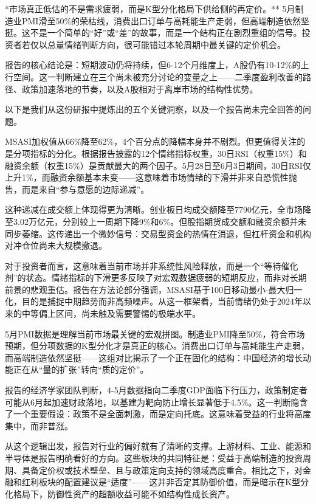 \documentclass[11pt]{ctexart}
\begin{document}
*市场真正低估的不是需求疲弱，而是K型分化格局下供给侧的再定价。** 5月制造业PMI滑至50\%的荣枯线，消费出口订单与高耗能生产走弱，但高端制造依然坚挺。这不是一个简单的“好”或“差”的故事，而是一个结构正在剧烈重组的信号。投资者若仅以总量情绪判断方向，很可能错过本轮周期中最关键的定价机会。

报告的核心结论是：短期波动仍将持续，但6-12个月维度上，A股仍有10-12\%的上行空间。这一判断建立在三个尚未被充分讨论的变量之上——二季度盈利改善的路径、政策加速落地的节奏，以及A股相对于离岸市场的结构性优势。

以下是我们从这份研报中提炼出的五个关键洞察，以及一个报告尚未完全回答的问题。

MSASI加权值从66\%降至62\%，4个百分点的降幅本身并不剧烈。但更值得关注的是分项指标的分化。根据报告披露的12个情绪指标权重，30日RSI（权重15\%）和融资余额（权重15\%）是贡献最大的两个因子。5月28日至6月3日期间，30日RSI仅上升1\%，而融资余额基本未变——这意味着市场情绪的下滑并非来自恐慌性抛售，而是来自“参与意愿的边际递减”。

这种递减在成交额上体现得更为清晰。创业板日均成交额降至7790亿元，全市场降至3.02万亿元，分别较上一周期下降9\%和6\%。但股指期货成交额和融资余额并未同步萎缩。这传递出一个微妙信号：交易型资金的热情在消退，但杠杆资金和机构对冲仓位尚未大规模撤退。

对于投资者而言，这意味着当前市场并非系统性风险释放，而是一个“等待催化剂”的状态。情绪指标的下滑更多反映了对宏观数据疲弱的短期反应，而非对长期前景的悲观重估。报告在方法论部分强调，MSASI基于100日移动最小-最大归一化，目的是捕捉中期趋势而非高频噪声。从这一框架看，当前情绪仍处于2024年以来的中等偏上区间，尚未触及需要警惕的极端水平。

5月PMI数据是理解当前市场最关键的宏观拼图。制造业PMI降至50\%，符合市场预期，但分项数据的K型分化才是真正的核心。消费出口订单与高耗能生产走弱，而高端制造依然坚挺——这组对比揭示了一个正在固化的结构：中国经济的增长动能正在从“量的扩张”转向“质的定价”。

报告的经济学家团队判断，4-5月数据指向二季度GDP面临下行压力，政策制定者可能从6月起加速财政落地，以基建为靶向防止增长显著低于4.5\%。这一判断隐含了一个重要假设：政策不是全面刺激，而是定向托底。这意味着受益的行业将高度集中，而非普涨。

从这个逻辑出发，报告对行业的偏好就有了清晰的支撑。上游材料、工业、能源和半导体是报告明确看好的方向。这些板块的共同特征是：受益于高端制造的投资周期、具备定价权或技术壁垒、且与政策定向支持的领域高度重合。相比之下，对金融和红利板块的配置建议是“适度”——这并非否定其防御价值，而是暗示在K型分化格局下，防御性资产的超额收益可能不如结构性成长资产。
\end{document}
